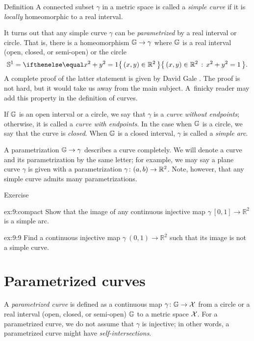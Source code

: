 \begin{thm}{Definition} 
A connected subset $\gamma$ in a metric space is called a \emph{simple curve} if it is {}\emph{locally} homeomorphic to a real interval.
\end{thm}

It turns out that any simple curve $\gamma$ can be \emph{parametrized} by a real interval or circle.
That is, there is a homeomorphism $\mathbb{G}\to\gamma$ 
where $\mathbb{G}$ is a real interval (open, closed, or semi-open) or the circle
\[\mathbb{S}^1=\set{(x,y)\in\mathbb{R}^2}{x^2+y^2=1}.\] 
A complete proof of the latter statement is given by David Gale \cite{gale}.
The proof is not hard, but it would take us away from the main subject.
A~finicky reader may add this property in the definition of curves.

If $\mathbb{G}$ is an open interval or a circle, we say that $\gamma$ is a \emph{curve without endpoints}; otherwise, it is 
called a {}\emph{curve with endpoints}.
In the case when $\mathbb{G}$ is a circle, we say that the curve is \emph{closed}. 
When $\mathbb{G}$ is a closed interval, $\gamma$ is called a {}\emph{simple arc}.


A parametrization $\mathbb{G}\to\gamma$ describes a curve completely.
We will denote a curve and its parametrization by the same letter;
for example, we may say a plane curve $\gamma$ is given with a parametrization $\gamma\:(a,b)\z\to \mathbb{R}^2$.
Note, however, that any simple curve admits many parametrizations. 

\begin{thm}{Exercise}\label{ex:9}

\begin{subthm}{ex:9:compact}
Show that the image of any continuous injective map $\gamma\:[0,1]\to\mathbb{R}^2$ is a simple arc.
\end{subthm}

\begin{subthm}{ex:9:9}
Find a continuous injective map $\gamma\:(0,1)\to\mathbb{R}^2$ such that its image is not a simple curve.
\end{subthm}

\end{thm}


\section{Parametrized curves}

A \emph{parametrized curve} is defined as a continuous map $\gamma\colon\mathbb{G}\to\mathcal{X}$ from a circle or a real interval (open, closed, or semi-open) $\mathbb{G}$ to a metric space $\mathcal{X}$. 
For a parametrized curve, we do not assume that $\gamma$ is injective; in other words, a parametrized curve might have \emph{self-intersections}.


